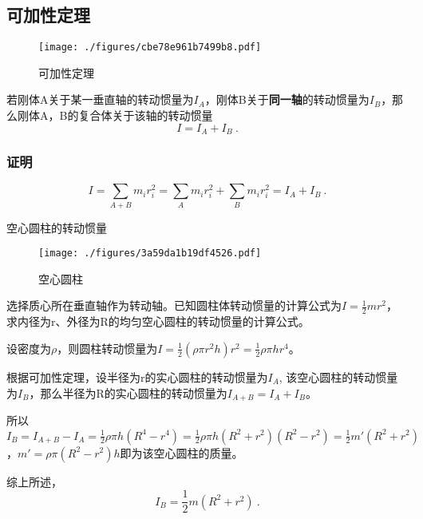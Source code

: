 \subsection{可加性定理}
\begin{figure}[ht]
\centering
\texttt{[image: ./figures/cbe78e961b7499b8.pdf]}
\caption{可加性定理} \label{fig_MIthm_3}
\end{figure}
若刚体A关于某一垂直轴的转动惯量为$I_A$，刚体B关于\textbf{同一轴}的转动惯量为$I_B$，那么刚体A，B的复合体关于该轴的转动惯量
\begin{equation}
I=I_A+I_B~.
\end{equation}

\subsubsection{证明}
\begin{equation}
I=\sum_{A+B} m_i r_i^2=\sum_{A} m_i r_i^2 +\sum_B m_i r_i^2 = I_A+I_B~.
\end{equation}

\begin{example}{空心圆柱的转动惯量}
\begin{figure}[ht]
\centering
\texttt{[image: ./figures/3a59da1b19df4526.pdf]}
\caption{空心圆柱} \label{fig_MIthm_4}
\end{figure}
选择质心所在垂直轴作为转动轴。已知圆柱体转动惯量的计算公式为$I=\frac{1}{2}mr^2$，求内径为r、外径为R的均匀空心圆柱的转动惯量的计算公式。

设密度为$\rho$，则圆柱转动惯量为$I=\frac{1}{2}(\rho \pi r^2 h) r^2=\frac{1}{2}\rho \pi h r^4$。

根据可加性定理，设半径为r的实心圆柱的转动惯量为$I_A$, 该空心圆柱的转动惯量为$I_B$，那么半径为R的实心圆柱的转动惯量为$I_{A+B}=I_A+I_B$。

所以$I_B=I_{A+B}-I_A=\frac{1}{2}\rho \pi h (R^4-r^4)=\frac{1}{2}\rho \pi h (R^2+r^2)(R^2-r^2)=\frac{1}{2}m'(R^2+r^2)$，$m'=\rho \pi (R^2-r^2) h$即为该空心圆柱的质量。

综上所述，
\begin{equation}
I_B=\frac{1}{2}m(R^2+r^2)~.
\end{equation}
\end{example}

